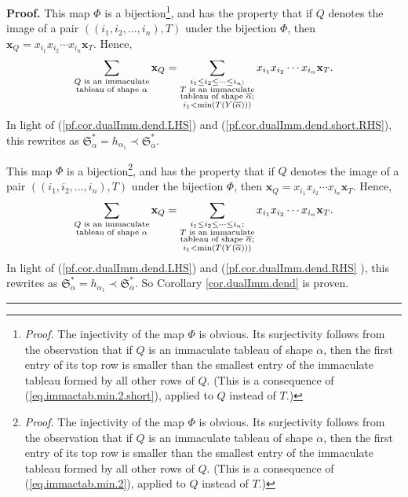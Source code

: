 \documentclass[numbers=enddot,12pt,final,onecolumn,notitlepage,abstracton]{scrartcl}%
\theoremstyle{definition}
\newenvironment{proof}[1][Proof]{\noindent\textbf{#1.} }{\ \rule{0.5em}{0.5em}}
\newenvironment{verlong}{}{}
\newenvironment{vershort}{}{}
\let\sumnonlimits\sum
\renewcommand{\sum}{\sumnonlimits\limits}
\begin{document}
\begin{proof}
\begin{vershort}
This map $\Phi$ is a bijection\footnote{\textit{Proof.} The injectivity of the
map $\Phi$ is obvious. Its surjectivity follows from the observation that if
$Q$ is an immaculate tableau of shape $\alpha$, then the first entry of its
top row is smaller than the smallest entry of the immaculate tableau formed by
all other rows of $Q$. (This is a consequence of
(\ref{eq.immactab.min.2.short}), applied to $Q$ instead of $T$.)}, and has the
property that if $Q$ denotes the image of a pair $\left(  \left(  i_{1}%
,i_{2},\ldots,i_{n}\right)  ,T\right)  $ under the bijection $\Phi$, then
$\mathbf{x}_{Q}=x_{i_{1}}x_{i_{2}}\cdots x_{i_{n}}\mathbf{x}_{T}$. Hence,%
\[
\sum_{\substack{Q\text{ is an immaculate}\\\text{tableau of shape }\alpha
}}\mathbf{x}_{Q}=\sum\limits_{\substack{i_{1}\leq i_{2}\leq\cdots\leq
i_{n};\\T\text{ is an immaculate}\\\text{tableau of shape }\overline{\alpha
};\\i_{1}<\min\left(  T\left(  Y\left(  \overline{\alpha}\right)  \right)
\right)  }}x_{i_{1}}x_{i_{2}}\cdots x_{i_{n}}\mathbf{x}_{T}.
\]
In light of (\ref{pf.cor.dualImm.dend.LHS}) and
(\ref{pf.cor.dualImm.dend.short.RHS}), this rewrites as $\mathfrak{S}_{\alpha
}^{\ast}=h_{\alpha_{1}}\left.  \prec\right.  \mathfrak{S}_{\overline{\alpha}%
}^{\ast}$.
\end{vershort}

\begin{verlong}
This map $\Phi$ is a bijection\footnote{\textit{Proof.} The injectivity of the
map $\Phi$ is obvious. Its surjectivity follows from the observation that if
$Q$ is an immaculate tableau of shape $\alpha$, then the first entry of its
top row is smaller than the smallest entry of the immaculate tableau formed by
all other rows of $Q$. (This is a consequence of (\ref{eq.immactab.min.2}),
applied to $Q$ instead of $T$.)}, and has the property that if $Q$ denotes the
image of a pair $\left(  \left(  i_{1},i_{2},\ldots,i_{n}\right)  ,T\right)  $
under the bijection $\Phi$, then $\mathbf{x}_{Q}=x_{i_{1}}x_{i_{2}}\cdots
x_{i_{n}}\mathbf{x}_{T}$. Hence,%
\[
\sum_{\substack{Q\text{ is an immaculate}\\\text{tableau of shape }\alpha
}}\mathbf{x}_{Q}=\sum\limits_{\substack{i_{1}\leq i_{2}\leq\cdots\leq
i_{n};\\T\text{ is an immaculate}\\\text{tableau of shape }\overline{\alpha
};\\i_{1}<\min\left(  T\left(  Y\left(  \overline{\alpha}\right)  \right)
\right)  }}x_{i_{1}}x_{i_{2}}\cdots x_{i_{n}}\mathbf{x}_{T}.
\]
In light of (\ref{pf.cor.dualImm.dend.LHS}) and (\ref{pf.cor.dualImm.dend.RHS}%
), this rewrites as $\mathfrak{S}_{\alpha}^{\ast}=h_{\alpha_{1}}\left.
\prec\right.  \mathfrak{S}_{\overline{\alpha}}^{\ast}$. So Corollary
\ref{cor.dualImm.dend} is proven.
\end{verlong}
\end{proof}
\end{document}
